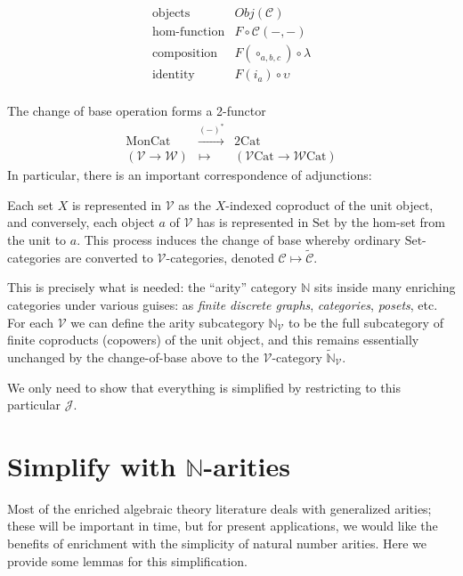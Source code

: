 \documentclass[a4paper,UKenglish]{article}
\theoremstyle{definition}
\def\ld{\rotatebox[origin=c]{-90}{$\dashv$}} %
\newcommand{\Set}{\mathrm{Set}}
\newcommand{\Cat}{\mathrm{Cat}}
\newcommand{\Mon}{\mathrm{Mon}}
\newcommand{\NN}{\mathbb{N}}
\newcommand{\V}{\mathscr{V}}
\newcommand{\W}{\mathscr{W}}
\newcommand{\C}{\mathscr{C}}
\newcommand{\J}{\mathscr{J}}
\begin{document}
\[\begin{array}{rl}
\text{objects} & Obj(\C)\\
\text{hom-function} & F \circ \C(-,-)\\
\text{composition} & F(\circ_{a,b,c}) \circ \lambda\\
\text{identity} & F(i_a) \circ \upsilon\\
\end{array}\]

The change of base operation forms a 2-functor
\[\begin{array}{ccc}
\Mon\Cat & \xrightarrow{(-)^*} & 2\Cat\\
(\V\to\W) & \mapsto & (\V\Cat\to\W\Cat)
\end{array}\]
In particular, there is an important correspondence of adjunctions:
\begin{center}
\end{center}

Each set $X$ is represented in $\V$ as the $X$-indexed coproduct of the unit object, and conversely, each object $a$ of $\V$ has is represented in $\Set$ by the hom-set from the unit to $a$. This process induces the change of base whereby ordinary $\Set$-categories are converted to $\V$-categories, denoted $\C \mapsto \tilde{\C}$.

This is precisely what is needed: the ``arity'' category $\NN$ sits inside many enriching categories under various guises: as \textit{finite discrete graphs}, \textit{categories}, \textit{posets}, etc. For each $\V$ we can define the arity subcategory $\NN_\V$ to be the full subcategory of finite coproducts (copowers) of the unit object, and this remains essentially unchanged by the change-of-base above to the $\V$-category $\tilde{\NN}_\V$.

We only need to show that everything is simplified by restricting to this particular $\J$.

\section{Simplify with $\NN$-arities}

Most of the enriched algebraic theory literature deals with generalized arities; these will be important in time, but for present applications, we would like the benefits of enrichment with the simplicity of natural number arities. Here we provide some lemmas for this simplification.
\end{document}
